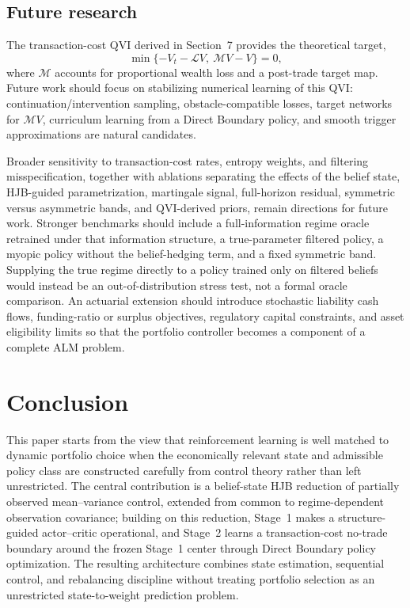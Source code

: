 \documentclass[a4paper,10pt]{article}
\begin{document}
\subsection{Future research}

The transaction-cost QVI derived in Section~7 provides the theoretical target,
\begin{equation}
\min\{-V_t-\mathcal LV,\ \mathcal MV-V\}=0,
\end{equation}
where $\mathcal M$ accounts for proportional wealth loss and a post-trade target map. Future work should focus on stabilizing numerical learning of this QVI: continuation/intervention sampling, obstacle-compatible losses, target networks for $\mathcal M V$, curriculum learning from a Direct Boundary policy, and smooth trigger approximations are natural candidates.

Broader sensitivity to transaction-cost rates, entropy weights, and filtering misspecification, together with ablations separating the effects of the belief state, HJB-guided parametrization, martingale signal, full-horizon residual, symmetric versus asymmetric bands, and QVI-derived priors, remain directions for future work. Stronger benchmarks should include a full-information regime oracle retrained under that information structure, a true-parameter filtered policy, a myopic policy without the belief-hedging term, and a fixed symmetric band. Supplying the true regime directly to a policy trained only on filtered beliefs would instead be an out-of-distribution stress test, not a formal oracle comparison. An actuarial extension should introduce stochastic liability cash flows, funding-ratio or surplus objectives, regulatory capital constraints, and asset eligibility limits so that the portfolio controller becomes a component of a complete ALM problem.

\section{Conclusion}

This paper starts from the view that reinforcement learning is well matched to dynamic portfolio choice when the economically relevant state and admissible policy class are constructed carefully from control theory rather than left unrestricted. The central contribution is a belief-state HJB reduction of partially observed mean--variance control, extended from common to regime-dependent observation covariance; building on this reduction, Stage~1 makes a structure-guided actor--critic operational, and Stage~2 learns a transaction-cost no-trade boundary around the frozen Stage~1 center through Direct Boundary policy optimization. The resulting architecture combines state estimation, sequential control, and rebalancing discipline without treating portfolio selection as an unrestricted state-to-weight prediction problem.
\end{document}
